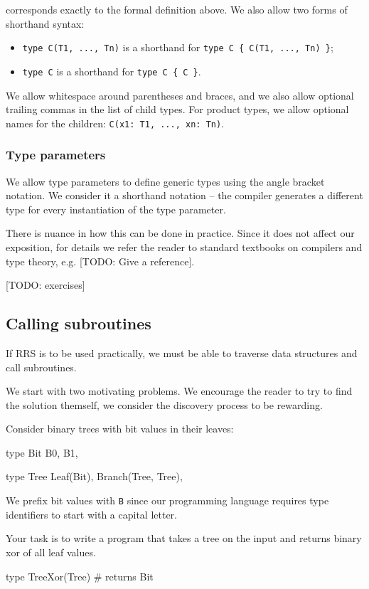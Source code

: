 \documentclass[11pt]{article}
\begin{document}
corresponds exactly to the formal definition above. We also allow two forms of shorthand
syntax:

\begin{itemize}
  \item \lstinline|type C(T1, ..., Tn)| is a shorthand for
  \lstinline|type C { C(T1, ..., Tn) }|;
  \item \lstinline|type C| is a shorthand for \lstinline|type C { C }|.
\end{itemize}

We allow whitespace around parentheses and braces, and we
also allow optional trailing commas in the list of child types. For product types,
we allow optional names for the children: \lstinline|C(x1: T1, ..., xn: Tn)|.

\subsubsection{Type parameters}

We allow type parameters to define generic types using the angle bracket notation.
We consider it a shorthand notation -- the compiler generates a different type
for every instantiation of the type parameter.

There is nuance in how this can be done in practice. Since it does not affect
our exposition, for details we refer the reader to standard textbooks on
compilers and type theory, e.g. [TODO: Give a reference].

[TODO: exercises]

\subsection{Calling subroutines}

If RRS is to be used practically, we must be able to traverse data structures
and call subroutines.

We start with two motivating problems. We encourage the
reader to try to find the solution themself, we consider the discovery process
to be rewarding.

\begin{exercise}[TreeXor]\label{ex:tree-xor}
Consider binary trees with bit values in their leaves:

\begin{rrscode}
type Bit {
  B0,
  B1,
}

type Tree {
  Leaf(Bit),
  Branch(Tree, Tree),
}
\end{rrscode}

We prefix bit values with \lstinline|B| since our programming language requires type
identifiers to start with a capital letter.

Your task is to write a program that takes a tree on the input and returns binary
xor of all leaf values.

\begin{rrscode}
type TreeXor(Tree)  # returns Bit
\end{rrscode}

\end{exercise}
\end{document}
